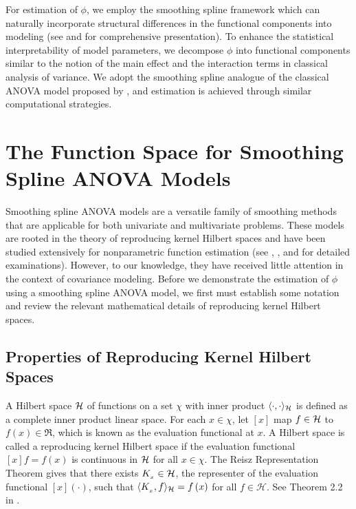 \bigskip

For estimation of $\phi$, we employ the smoothing spline framework which can naturally incorporate structural differences in the functional components into modeling (see \cite{kimeldorf1971some} and \cite{wahba1990spline} for comprehensive presentation). To enhance the statistical interpretability of model parameters, we decompose $\phi$ into functional components similar to the notion of the main effect and the interaction terms in classical analysis of variance. We adopt the smoothing spline analogue of the classical ANOVA model proposed by \cite{gu2013smoothing}, and estimation is achieved through similar computational strategies.



\section{The Function Space for Smoothing Spline ANOVA Models} \label{SSANOVA-function-space}

Smoothing spline ANOVA models \citep{gu2002smoothing} are a versatile family of smoothing methods that are applicable for both univariate and multivariate problems. These models are rooted in the theory of reproducing kernel Hilbert spaces and have been studied extensively for nonparametric function estimation (see \cite{aronszajn1950theory}, \cite{wahba1990spline}, and \cite{berlinet2011reproducing} for detailed examinations).  However, to our knowledge, they have received little attention in the context of covariance modeling. Before we demonstrate the estimation of $\phi$ using a smoothing spline ANOVA model, we first must establish some notation and review the relevant mathematical details of reproducing kernel Hilbert spaces. 



\subsection{Properties of Reproducing Kernel Hilbert Spaces}

A Hilbert space $\mathcal{H}$ of functions on a set $\chi$ with inner product $\langle \cdot, \cdot\rangle_{\mathcal{H}}$ is defined as a complete inner product linear space. For each $x \in \chi$, let $\left[x \right]$ map $f \in \mathcal{H}$ to $f\left(x\right) \in \Re$, which is known as the evaluation functional at $x$. A Hilbert space is called a reproducing kernel Hilbert space if the evaluation functional $\left[x\right]f = f\left(x\right)$ is continuous in $\mathcal{H}$ for all $x \in \chi$. The Reisz Representation Theorem gives that there exists $K_{_x} \in \mathcal{H}$, the representer of the evaluation functional $\left[x\right]\left(\cdot\right)$, such that $\langle K_{_x}, f \rangle_{\mathcal{H}} = f\left(x\right)$ for all $f \in \mathcal{H}$. See Theorem 2.2 in \cite{gu2013smoothing}.

